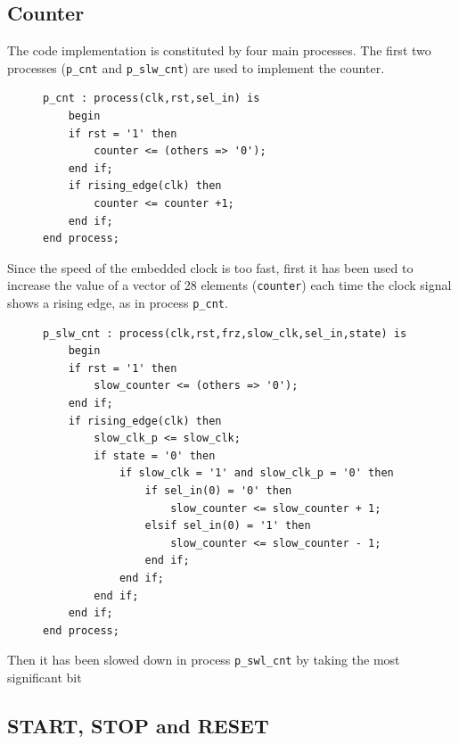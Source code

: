 \documentclass[11pt, a4paper]{article}
\begin{document}
\subsection{Counter}
The code implementation is constituted by four main processes. The first two processes (\texttt{p\_cnt} and \texttt{p\_slw\_cnt}) are used to implement the counter.

\begin{figure}[h!]
    \begin{lstlisting}[style=vhdl]
p_cnt : process(clk,rst,sel_in) is
    begin
    if rst = '1' then
        counter <= (others => '0');
    end if;
    if rising_edge(clk) then
        counter <= counter +1;
    end if;
end process;\end{lstlisting}
    \caption{\label{}}
\end{figure}

Since the speed of the embedded clock is too fast, first it has been used to increase the value of a vector of 28 elements (\texttt{counter}) each time the clock signal shows a rising edge, as in process \texttt{p\_cnt}.

\begin{figure}[h!]
    \begin{lstlisting}[style=vhdl]
p_slw_cnt : process(clk,rst,frz,slow_clk,sel_in,state) is
    begin
    if rst = '1' then
        slow_counter <= (others => '0');
    end if;
    if rising_edge(clk) then
        slow_clk_p <= slow_clk;
        if state = '0' then
            if slow_clk = '1' and slow_clk_p = '0' then
                if sel_in(0) = '0' then
                    slow_counter <= slow_counter + 1;
                elsif sel_in(0) = '1' then
                    slow_counter <= slow_counter - 1;
                end if;
            end if;
        end if;
    end if;
end process;\end{lstlisting}
    \caption{\label{}}
\end{figure}

Then it has been slowed down in process \texttt{p\_swl\_cnt} by taking the most significant bit 

\subsection{START, STOP and RESET}
\end{document}
